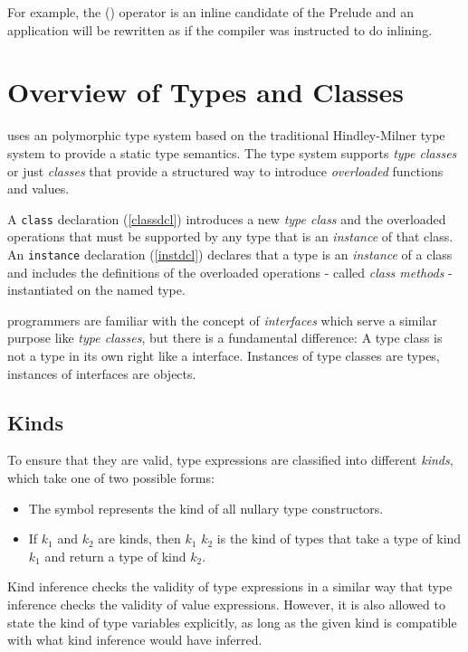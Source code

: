 For example, the (\sym{\$}) operator is an inline candidate of the Prelude and an application 
will be rewritten as  if the compiler was instructed to do inlining.


\section{Overview of Types and Classes}
\frege{} uses an polymorphic type system based on the traditional Hindley-Milner type system \cite{ptifart} to provide a static type semantics. The type system supports \emph{type classes} or just \emph{classes} that provide a structured way to introduce \emph{overloaded} functions and values.

A \texttt{class} declaration (\autoref{classdcl}) introduces a new \emph{type class} and the overloaded operations that must be supported by any type that is an \emph{instance}\label{instance} of that class. An \texttt{instance} declaration (\autoref{instdcl}) declares that a type is an \emph{instance} of a class and includes the definitions of the overloaded operations - called \emph{class methods} - instantiated on the named type.  

\java{} programmers are familiar with the concept of \emph{interfaces} which serve a similar purpose like \emph{type classes}, but there is a fundamental difference: A \frege{} type class is not a type in its own right like a \java{} interface. Instances of type classes are types, instances of \java{} interfaces are objects.

\subsection{Kinds}

To ensure that they are valid, type expressions are classified into different \emph{kinds}, which take one of two possible forms:

\begin{itemize}
\item The symbol \sym{*} represents the kind of all nullary type constructors.

\item If $k_1$ and $k_2$ are kinds, then $k_1$ \arrow{} $k_2$ is the kind of types that take a type of kind $k_1$ and return a type of kind $k_2$.

\end{itemize}

Kind inference checks the validity of type expressions in a similar way that type inference checks the validity of value expressions. However, it is also allowed to state the kind of type variables explicitly, as long as the given kind is compatible with what kind inference would have inferred.

